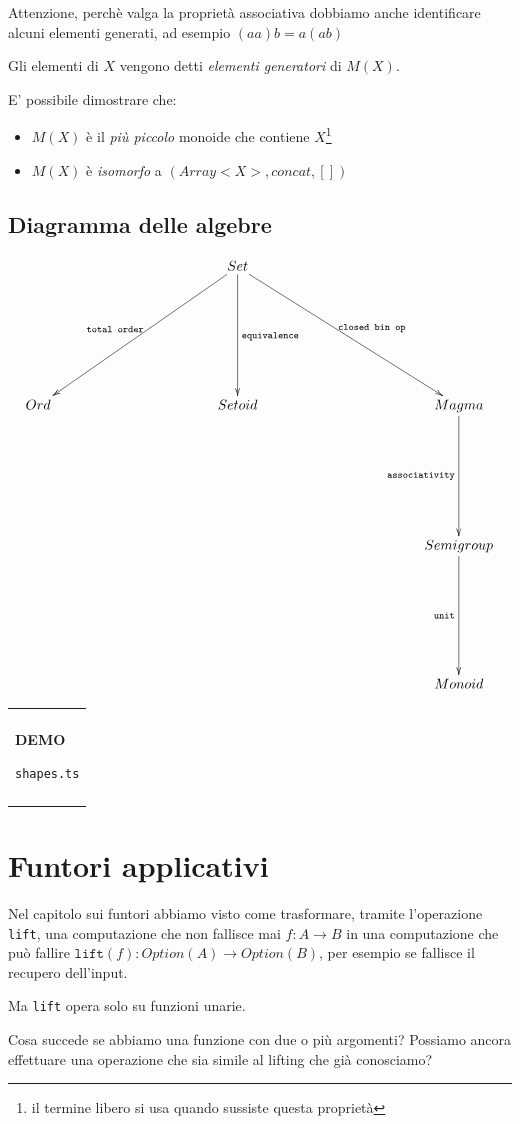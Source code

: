\documentclass[12pt]{article}
\newenvironment{boxed}
    {\begin{center}
    \begin{tabular}{|p{0.9\textwidth}|}
    \hline\\
    }
    {
    \\\\\hline
    \end{tabular}
    \end{center}
    }
\begin{document}
Attenzione, perchè valga la proprietà associativa dobbiamo anche identificare alcuni elementi generati, ad esempio $(aa)b = a(ab)$

Gli elementi di $X$ vengono detti \emph{elementi generatori} di $M(X)$.

E' possibile dimostrare che:

\begin{itemize}
  \item $M(X)$ è il \emph{più piccolo} monoide che contiene $X$\footnote{il termine libero si usa quando sussiste questa proprietà}
  \item $M(X)$ è \emph{isomorfo} a $(Array<X>, concat, [])$
\end{itemize}

\subsection{Diagramma delle algebre}

\[
\xymatrixrowsep{3cm}
\xymatrixcolsep{4cm}
\xymatrix{
  & Set \ar[dl]_{\texttt{total order}} \ar[d]^{\texttt{equivalence}} \ar[dr]^{\texttt{closed bin op}} \\
  Ord & Setoid & Magma \ar[d]_{\texttt{associativity}} \\
  & & Semigroup \ar[d]_{\texttt{unit}} \\
  & & Monoid \\
}
\]

\begin{boxed}
\begin{center}
\textbf{DEMO}

\texttt{shapes.ts}
\end{center}
\end{boxed}


\section{Funtori applicativi}

Nel capitolo sui funtori abbiamo visto come trasformare, tramite l'operazione \texttt{lift},
una computazione che non fallisce mai $f: A \rightarrow B$ in una computazione che può fallire $\texttt{lift}(f): Option(A) \rightarrow Option(B)$,
per esempio se fallisce il recupero dell'input.

Ma \texttt{lift} opera solo su funzioni unarie.

Cosa succede se abbiamo una funzione con due o più argomenti?
Possiamo ancora effettuare una operazione che sia simile al lifting che già conosciamo?
\end{document}
